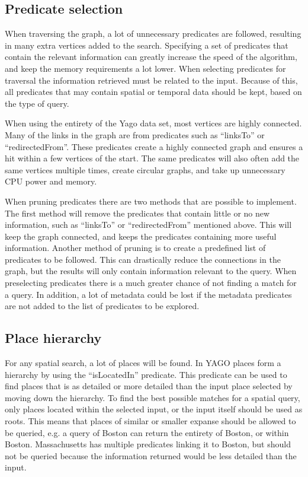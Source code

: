 \subsection{Predicate selection}
When traversing the graph, a lot of unnecessary predicates are followed, resulting in many extra vertices added to the search. Specifying a set of predicates that contain the relevant information can greatly increase the speed of the algorithm, and keep the memory requirements a lot lower. When selecting predicates for traversal the information retrieved must be related to the input. Because of this, all predicates that may contain spatial or temporal data should be kept, based on the type of query.

When using the entirety of the Yago data set, most vertices are highly connected. Many of the links in the graph are from predicates such as ``linksTo'' or ``redirectedFrom''. These predicates create a highly connected graph and ensures a hit within a few vertices of the start. The same predicates will also often add the same vertices multiple times, create circular graphs, and take up unnecessary CPU power and memory.

When pruning predicates there are two methods that are possible to implement. The first method will remove the predicates that contain little or no new information, such as ``linksTo'' or ``redirectedFrom'' mentioned above. This will keep the graph connected, and keeps the predicates containing more useful information. Another method of pruning is to create a predefined list of predicates to be followed. This can drastically reduce the connections in the graph, but the results will only contain information relevant to the query. When preselecting predicates there is a much greater chance of not finding a match for a query. In addition, a lot of metadata could be lost if the metadata predicates are not added to the list of predicates to be explored.

\subsection{Place hierarchy}
For any spatial search, a lot of places will be found.
In YAGO places form a hierarchy by using the ``isLocatedIn'' predicate. This predicate can be used to find places that is as detailed or more detailed than the input place selected by moving down the hierarchy. To find the best possible matches for a spatial query, only places located within the selected input, or the input itself should be used as roots. This means that places of similar or smaller expanse should be allowed to be queried, e.g. a query of Boston can return the entirety of Boston, or within Boston. Massachusetts has multiple predicates linking it to Boston, but should not be queried because the information returned would be less detailed than the input. 

\glsresetall

